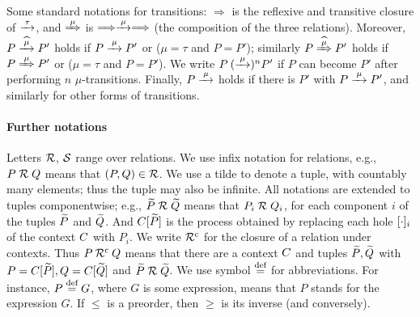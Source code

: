 Some standard notations for transitions:  $\Longrightarrow $ is the 
reflexive and  transitive closure of $\arr\tau $, and 
$\Arr \mu $ is $\Longrightarrow \arr\mu \Longrightarrow $ (the
composition of the three relations).
Moreover,   
$ 
P \arcap \mu P'$ holds if $P \arr\mu P'$ or ($\mu =\tau$ and
$P=P'$); similarly 
$ 
P \Arcap \mu P'$ holds if $P \Arr\mu P'$ or ($\mu =\tau$ and
$P=P'$).
We write $P \:(\arr\mu)^n P'$ if $P$ can become $P'$ after performing
$n$ $\mu$-transitions. Finally, $P \arr\mu$ holds if there is $P'$
with $P \arr\mu P'$, and similarly for other forms of transitions.




\paragraph{Further notations}
Letters  $\R$, $\S$ range over relations.
We use infix notation for relations, e.g., 
$P \RR Q$ means that $(P,Q) \in \R$.
We use a tilde to denote a tuple, with countably many elements; thus
the tuple may also be infinite.
 All
notations  are  extended to tuples componentwise;
e.g., $\til P \RR \til Q$ means that $P_i \RR Q_i$, for  each  
component $i$  of the tuples $\til P$ and $\til Q$.
And $\ct{\til P}$ is the process obtained by replacing each hole
$\holei i$ of the  context $\qct$ with $P_i$.  
We write $
\ctx \R$ for the closure of a relation under contexts. Thus $P\: \ctx \R\: Q$
means that there are a context $\qct$ and tuples $\til P,\til Q$ with
$P =  \ct{\til P}, Q =  \ct{\til Q}$ and    $\til P \RR \til Q$.
We use  symbol 
$\DSdefi$ for abbreviations. For instance, $P \DSdefi G $, where
$G$ is some expression, means that  $P$ stands
for the  expression
$G$.
If $\leq$ is a preorder, then  $\geq$  is its inverse (and
conversely).    